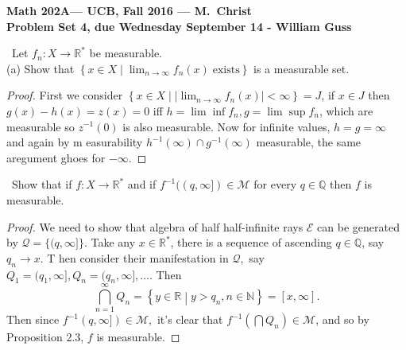 \documentclass[11pt]{amsart}
\theoremstyle{definition}
\numberwithin{theorem}{section}
\numberwithin{definition}{section}
\numberwithin{equation}{section}
\def\reals{{\mathbb R}}
\newcommand{\set}[1]{ \left\{ #1 \right\} }
\def\scriptq{{\mathcal Q}}
\def\scriptm{{\mathcal M}}
\def\scripte{{\mathcal E}}
\begin{document}
\begin{center}{\bf Math 202A--- UCB, Fall 2016 --- M.~Christ}
\\
{\bf Problem Set 4, due Wednesday September 14 - William Guss}
\end{center}
\medskip {}\ Let $f_n: X \to \mathbb{R}^*$ be measurable. \\
(a) Show that $\set{x \in X\mathrel{}\middle|\mathrel{} \lim_{n\to\infty}f_n(x)\;\mathrm{exists}}$ is a measurable set.
\begin{proof}
	First we consider $\set{x \in X\mathrel{}\middle|\mathrel{} |\lim_{n\to\infty}f_n(x)| < \infty} = J$, if $x \in J$ then $g(x) - h(x) = z(x) = 0$ iff $h = \lim \inf f_n, g = \lim \sup f_n$, which are measurable so $z^{-1}(0)$ is also measurable. Now for infinite values, $h = g = \infty$ and again by m easurability $h^{-1}(\infty) \cap g^{-1}(\infty)$ measurable, the same aregument ghoes for $-\infty.$
\end{proof}
\medskip {}\ Show that if $f: X \to \mathbb{R}^* $ and if $f^{-1}((q, \infty]) \in \scriptm$ for every $q\in\mathbb{Q}$ then $f$ is measurable.
\begin{proof}
 	We need to show that algebra of half half-infinite rays $\scripte$ can be generated by $\scriptq = \{(q, \infty]\}$. Take any $x \in \reals^*$, there is a sequence of ascending $q \in \mathbb{Q}$, say $q_n \to x$. T hen consider their manifestation in $\scriptq,$ say $Q_1 = (q_1, \infty], Q_n =(q_n, \infty], \dots$. Then
 	\begin{equation*}
 		\bigcap_{n=1}^\infty Q_n = \set{y \in \mathbb{R} \mathrel{}\middle|\mathrel{} y > q_n, n \in \mathbb{N}} = [x, \infty].
 	 \end{equation*}
 	 Then since $f^{-1}(q, \infty]) \in \scriptm,$ it's clear that $f^{-1}(\bigcap Q_n) \in \scriptm$, and so by Proposition 2.3, $f$ is measurable.
 \end{proof}  
\end{document}
